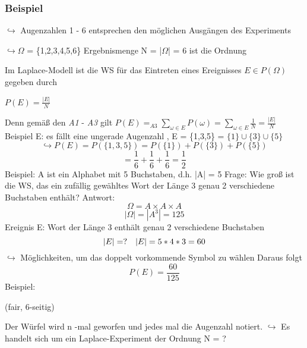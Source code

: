 \documentclass[12pt,a4paper]{article}
\newcommand{\newpara}{\vskip 0.5cm}
\begin{document}
		\subsubsection*{Beispiel }
		$\hookrightarrow$ Augenzahlen 1 - 6 entsprechen den möglichen Ausgängen des Experiments
		\par
		\begingroup
		\leftskip=2cm
			\noindent $\hookrightarrow\Omega$ = \{1,2,3,4,5,6\} Ergebnismenge \newline
			N = |$\Omega$| = 6 ist die Ordnung
		\par
		\endgroup
		Im Laplace-Modell ist die WS für das Eintreten eines Ereignisses $E\in P(\Omega)$ gegeben
		durch
		\begin{center} 
		\textbf{$P(E) = \frac{|E|}{N}$}				
		\end{center}
		Denn gemäß den \textit{A1} - \textit{A3} gilt \newline
		$P(E) =_{A3} \sum_{\omega\in E}P({\omega}) = \sum_{\omega\in E}\frac{1}{N} = 
		\frac{|E|}{N}$ \newline
		Beispiel \newline
		E: es fällt eine ungerade Augenzahl , \space\space E = \{1,3,5\} = $\{1\}\cup\{3\}\cup\{5\}$ 
		$$\hookrightarrow P(E) = P(\{1,3,5\}) = P(\{1\}) + P(\{3\}) +
		P(\{5\})$$ 
		$$= \frac{1}{6} + \frac{1}{6} + \frac{1}{6} = \frac{1}{2}$$ 		
\newpage
		Beispiel: \newline
		A ist ein Alphabet mit 5 Buchstaben, d.h. |A| = 5 
\newpara
		Frage: \newline
		Wie groß ist die WS, das ein zufällig gewähltes Wort der Länge 3 genau 2 verschiedene Buchstaben
		enthält? \newline
		Antwort: 
		$$\Omega = A \times A \times A$$ 
		$$|\Omega| = |A^3| = 125$$ 
		Ereignis E: Wort der Länge 3 enthält genau 2 verschiedene Buchstaben
		$$|E| = ? \quad |E| = 5 * 4 * 3 = 60 \newline$$
		$\hookrightarrow$ Möglichkeiten, um das doppelt vorkommende Symbol zu wählen \newline
		Daraus folgt $$P(E) = \frac{60}{125}$$ 
\newpara
		Beispiel:  \newline
		\begin{small}
		(fair, 6-seitig)
		\end{small} \newline
		Der Würfel wird n -mal geworfen und jedes mal die Augenzahl notiert. \newline
		$\hookrightarrow$ Es handelt sich um ein Laplace-Experiment der Ordnung N = ?
\end{document}

